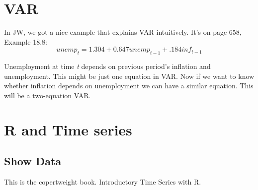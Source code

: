 \documentclass{book}
\begin{document}
\section{VAR}
In JW, we got a nice example that explains VAR intuitively. It's on page 658, Example 18.8:
$$ unemp_t= 1.304 + 0.647 unemp_{t-1}+ .184 inf_{t-1} $$

Unemployment at time \textit{t} depends on previous period's inflation and unemployment. This might be just one equation in VAR. Now if we want to know whether inflation depends on unemployment we can have a similar equation. This will be a two-equation VAR.



\section{R and Time series}
\subsection{Show Data}
This is the copertweight book. Introductory Time Series with R.
\end{document}
